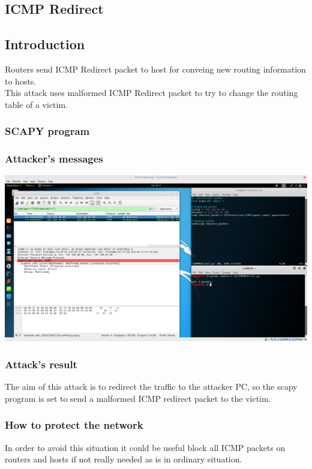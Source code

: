 \subsection{ICMP Redirect}
\subsection{Introduction}
Routers send ICMP Redirect packet to host for conveing new routing information to hosts.\\
This attack uses malformed ICMP Redirect packet to try to change the routing table of a victim.\par

\subsubsection{SCAPY program}


\subsubsection{Attacker's messages}
\includegraphics[width=16cm]{img/ICMPRedirect.png}

\subsubsection{Attack's result}
The aim of this attack is to redirect the traffic to the attacker PC, so the scapy program is set to send a malformed ICMP redirect packet to the victim.

\subsubsection{How to protect the network}
In order to avoid this situation it could be useful block all ICMP packets on routers and hosts if not really needed as is in ordinary situation.
